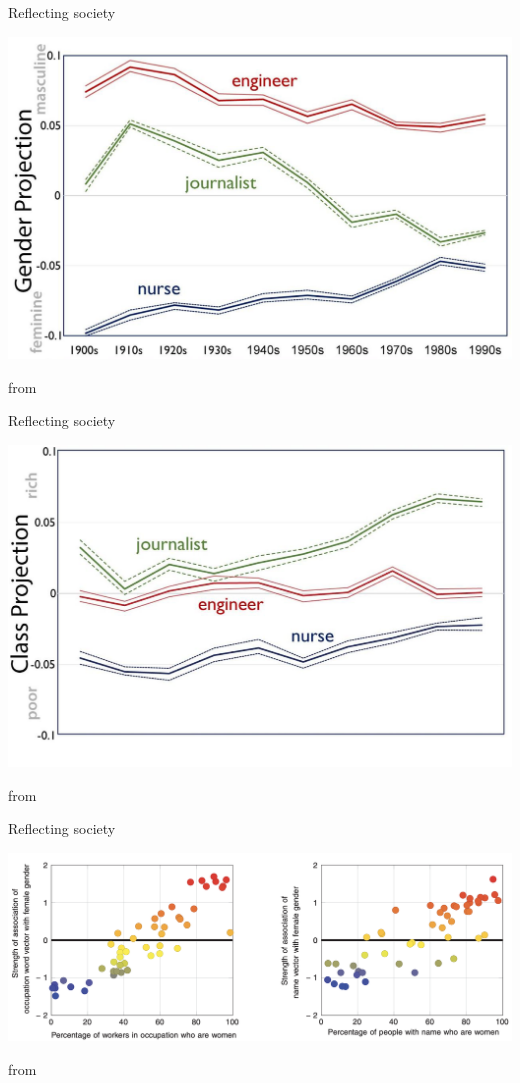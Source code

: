 \documentclass{hertieteaching}
\begin{document}
\begin{frame}[fragile]{Reflecting society}

\centerline{\includegraphics[scale = 0.4]{pictures/gender-proj}}

  from \textcite{Kozlowski.etal2019}
\end{frame}

\begin{frame}[fragile]{Reflecting society}

\centerline{\includegraphics[scale = 0.4]{pictures/class-proj}}

  from \textcite{Kozlowski.etal2019}
\end{frame}

\begin{frame}{Reflecting society}

\centerline{\includegraphics[scale = 0.3]{pictures/occupations-gender}}

from \textcite{Caliskan.etal2017}
\end{frame}
\end{document}
